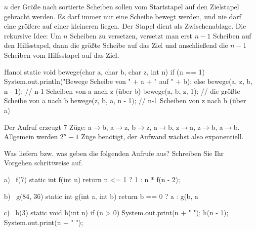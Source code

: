 $n$ der Größe nach sortierte Scheiben sollen vom Startstapel  auf den Zielstapel  gebracht werden. Es darf immer nur eine Scheibe bewegt werden, und nie darf eine größere auf einer kleineren liegen. Der Stapel  dient als Zwischenablage. Die rekursive Idee: Um $n$ Scheiben zu versetzen, versetzt man erst $n-1$ Scheiben auf den Hilfsstapel, dann die größte Scheibe auf das Ziel und anschließend die $n-1$ Scheiben vom Hilfsstapel auf das Ziel.
\begin{javacode}[Ausschnitt]{Hanoi}
static void bewege(char a, char b, char z, int n) {
	if (n == 1) {
		System.out.println("Bewege Scheibe von " + a + " auf " + b);
	} else {
		bewege(a, z, b, n - 1);     // n-1 Scheiben von a nach z (über b)
		bewege(a, b, z, 1);         // die größte Scheibe von a nach b
		bewege(z, b, a, n - 1);     // n-1 Scheiben von z nach b (über a)
	}
}
\end{javacode}
Der Aufruf  erzeugt 7 Züge: a$\to$b, a$\to$z, b$\to$z, a$\to$b, z$\to$a, z$\to$b, a$\to$b. Allgemein werden $2^n - 1$ Züge benötigt, der Aufwand wächst also exponentiell.

\aufgaben
{}
Was liefern bzw. was geben die folgenden Aufrufe aus? Schreiben Sie Ihr Vorgehen schrittweise auf.
\begin{tcbraster}[raster columns=2, raster equal height=rows, raster column skip=3mm, raster row skip=1mm]
\begin{javacode}[Ausschnitt]{a) \ f(7)}
static int f(int n) {
	return n <= 1 ? 1 : n * f(n - 2);
}
\end{javacode}
\begin{javacode}[Ausschnitt]{b) \ g(84, 36)}
static int g(int a, int b) {
	return b == 0 ? a : g(b, a %
}
\end{javacode}
\end{tcbraster}
\begin{javacode}[Ausschnitt]{c) \ h(3)}
static void h(int n) {
	if (n > 0) {
		System.out.print(n + " ");
		h(n - 1);
		System.out.print(n + " ");
	}
}
\end{javacode}

